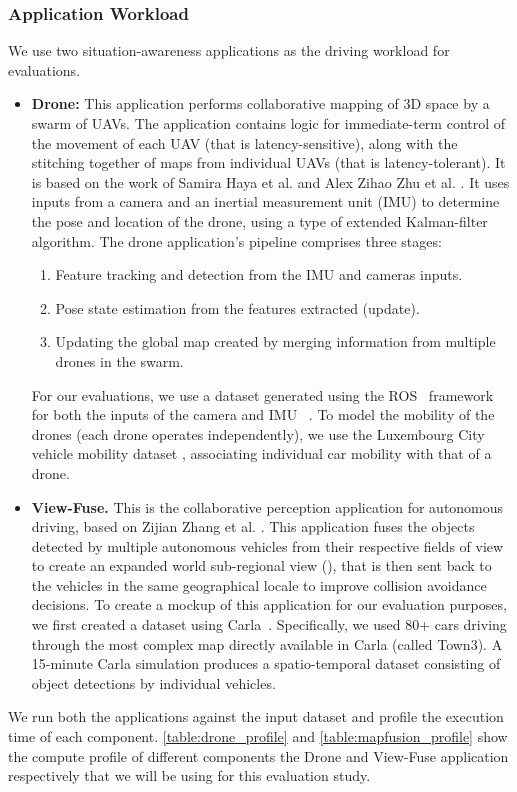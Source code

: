 \subsubsection{Application Workload}
We use two situation-awareness applications as the driving workload for evaluations. 
\begin{itemize}
\item \textbf{Drone: } This application performs collaborative mapping of 3D space by a swarm of UAVs. The application contains logic for immediate-term control of the movement of each UAV (that is latency-sensitive), along with the stitching together of maps from individual UAVs (that is latency-tolerant). It is based on the work of Samira Haya et al. \cite{dronenavi} and Alex Zihao Zhu et al. \cite{dronenavi1}. It uses inputs from a camera and an inertial measurement unit (IMU) to determine the pose and location of the drone, using a type of extended Kalman-filter algorithm. The drone application's pipeline comprises three stages: 
\begin{enumerate}
\item Feature tracking and detection from the IMU and cameras inputs.
\item Pose state estimation from the features extracted (update).
\item Updating the global map created by merging information from multiple drones in the swarm.
\end{enumerate}
For our evaluations, we use a dataset generated using the ROS~\cite{ros} framework for both the inputs of the camera and IMU ~\cite{dronedataset}. To model the mobility of the drones (each drone operates independently), we use the Luxembourg City vehicle mobility dataset \cite{lust}, associating individual car mobility with that of a drone. 

\item \textbf{View-Fuse.} This is the collaborative perception application for autonomous driving, based on Zijian Zhang et al. \cite{mapfusionimpl}. This application fuses the objects detected by multiple autonomous vehicles from their respective fields of view to create an expanded world sub-regional view (), that is then sent back to the vehicles in the same geographical locale to improve collision avoidance decisions. To create a mockup of this application for our evaluation purposes, we first created a dataset using Carla~\cite{carlasim}. Specifically, we used 80+ cars driving through the most complex map directly available in Carla (called Town3). A 15-minute Carla simulation produces a spatio-temporal dataset consisting of object detections by individual vehicles. 
\end{itemize}
We run both the applications against the input dataset and profile the execution time of each component. \cref{table:drone_profile} and \cref{table:mapfusion_profile} show the compute profile of different components the Drone and View-Fuse application respectively that we will be using for this evaluation study.


